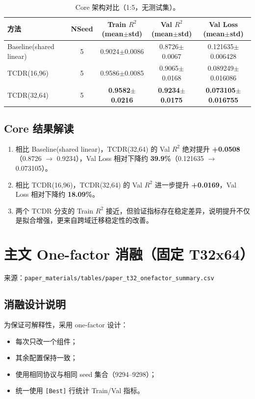 \documentclass[12pt,a4paper]{ctexart}
\begin{document}
\begin{table}[htbp]
\centering
\footnotesize
\setlength{\tabcolsep}{4pt}
\begin{tabular}{L{3.3cm}c c c c}
\toprule
方法 & NSeed & Train $R^2$ (mean$\pm$std) & Val $R^2$ (mean$\pm$std) & Val Loss (mean$\pm$std) \\
\midrule
Baseline(shared linear) & 5 & 0.9024$\pm$0.0086 & 0.8726$\pm$0.0067 & 0.121635$\pm$0.006428 \\
TCDR(16,96) & 5 & 0.9586$\pm$0.0085 & 0.9065$\pm$0.0168 & 0.089249$\pm$0.016086 \\
TCDR(32,64) & 5 & \textbf{0.9582$\pm$0.0216} & \textbf{0.9234$\pm$0.0175} & \textbf{0.073105$\pm$0.016755} \\
\bottomrule
\end{tabular}
\caption{Core 架构对比（1:5，无测试集）。}
\label{tab:core_cn}
\end{table}

\subsection{Core 结果解读}
\begin{enumerate}
  \item 相比 Baseline(shared linear)，TCDR(32,64) 的 Val $R^2$ 绝对提升 \textbf{+0.0508}（0.8726 $\rightarrow$ 0.9234），Val Loss 相对下降约 \textbf{39.9\%}（0.121635 $\rightarrow$ 0.073105）。
  \item 相比 TCDR(16,96)，TCDR(32,64) 的 Val $R^2$ 进一步提升 \textbf{+0.0169}，Val Loss 相对下降约 \textbf{18.09\%}。
  \item 两个 TCDR 分支的 Train $R^2$ 接近，但验证指标存在稳定差异，说明提升不仅是拟合增强，更来自跨域迁移稳定性的改善。
\end{enumerate}

\section{主文 One-factor 消融（固定 T32x64）}
来源：\texttt{paper\_materials/tables/paper\_t32\_onefactor\_summary.csv}

\subsection{消融设计说明}
为保证可解释性，采用 one-factor 设计：
\begin{itemize}
  \item 每次只改一个组件；
  \item 其余配置保持一致；
  \item 使用相同协议与相同 seed 集合（9294--9298）；
  \item 统一使用 \texttt{[Best]} 行统计 Train/Val 指标。
\end{itemize}
\end{document}
